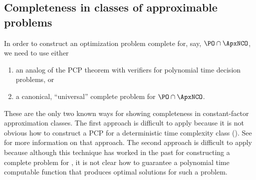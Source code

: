 \documentclass[]{article}
\newcommand{\APr}{\leq_{AP}^{L}}
\begin{document}


\subsection{Completeness in classes of approximable problems}

In order to construct an optimization problem complete for, say, $\PO \cap \ApxNCO$, we need to use either
\begin{enumerate}
\item an analog of the PCP theorem with \NC{} verifiers for polynomial time decision problems, or
\item a canonical, ``universal'' complete problem for $\PO \cap \ApxNCO$.
\end{enumerate}
These are the only two known ways for showing completeness in constant-factor approximation classes.
The first approach is difficult to apply because it is not obvious how to construct a PCP for a deterministic time complexity class (\PO).
See \cite{finkelstein13} for more information on that approach.
The second approach is difficult to apply because although this technique has worked in the past for constructing a complete problem for \ApxPO{} \cite[Lemma~2]{cp91}, it is not clear how to guarantee a polynomial time computable function that produces optimal solutions for such a problem.
\end{document}
